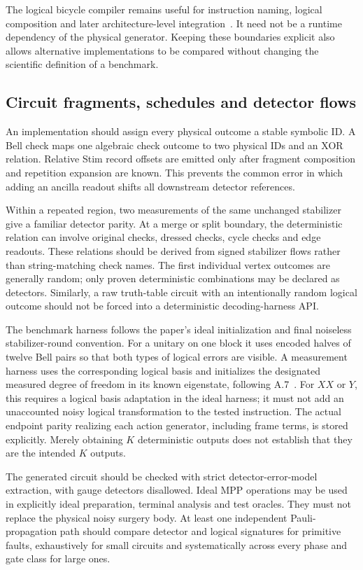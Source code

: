 \documentclass[11pt,a4paper]{article}
\begin{document}
The logical bicycle compiler remains useful for instruction naming, logical composition and later architecture-level integration~\cite{compiler}. It need not be a runtime dependency of the physical generator. Keeping these boundaries explicit also allows alternative implementations to be compared without changing the scientific definition of a benchmark.

\subsection{Circuit fragments, schedules and detector flows}

An implementation should assign every physical outcome a stable symbolic ID. A Bell check maps one algebraic check outcome to two physical IDs and an XOR relation. Relative Stim record offsets are emitted only after fragment composition and repetition expansion are known. This prevents the common error in which adding an ancilla readout shifts all downstream detector references.

Within a repeated region, two measurements of the same unchanged stabilizer give a familiar detector parity. At a merge or split boundary, the deterministic relation can involve original checks, dressed checks, cycle checks and edge readouts. These relations should be derived from signed stabilizer flows rather than string-matching check names. The first individual vertex outcomes are generally random; only proven deterministic combinations may be declared as detectors. Similarly, a raw truth-table circuit with an intentionally random logical outcome should not be forced into a deterministic decoding-harness API.

The benchmark harness follows the paper's ideal initialization and final noiseless stabilizer-round convention. For a unitary on one block it uses encoded halves of twelve Bell pairs so that both types of logical errors are visible. A measurement harness uses the corresponding logical basis and initializes the designated measured degree of freedom in its known eigenstate, following A.7~\cite{tdg}. For $XX$ or $Y$, this requires a logical basis adaptation in the ideal harness; it must not add an unaccounted noisy logical transformation to the tested instruction. The actual endpoint parity realizing each action generator, including frame terms, is stored explicitly. Merely obtaining $K$ deterministic outputs does not establish that they are the intended $K$ outputs.

The generated circuit should be checked with strict detector-error-model extraction, with gauge detectors disallowed. Ideal MPP operations may be used in explicitly ideal preparation, terminal analysis and test oracles. They must not replace the physical noisy surgery body. At least one independent Pauli-propagation path should compare detector and logical signatures for primitive faults, exhaustively for small circuits and systematically across every phase and gate class for large ones.
\end{document}
